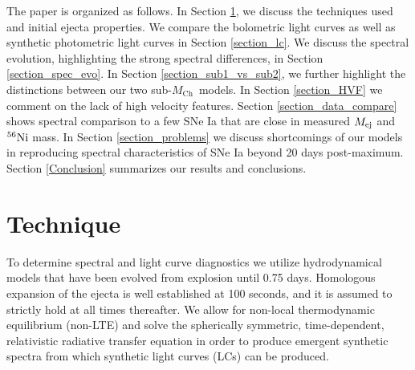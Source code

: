 \documentclass[useAMS,usenatbib,useasmath]{mnras}
\newcommand{\Mch}{\hbox{$M_{\text{Ch}}$}}
\newcommand{\elem}[2][default]{$^{#1}{\rm #2}$}
\begin{document}
The paper is organized as follows. In Section \ref{section_technique}, we discuss the techniques used and initial ejecta properties. We compare the bolometric light curves as well as synthetic photometric light curves in Section \ref{section_lc}. We discuss the spectral evolution, highlighting the strong spectral differences, in Section \ref{section_spec_evo}. In Section \ref{section_sub1_vs_sub2}, we further highlight the distinctions between our two sub-\Mch\ models. In Section \ref{section_HVF} we comment on the lack of high velocity features. Section \ref{section_data_compare} shows spectral comparison to a few SNe Ia that are close in measured $M_{\rm ej}$ and \elem[56]{Ni} mass. In Section \ref{section_problems} we discuss shortcomings of our models in reproducing spectral characteristics of SNe Ia beyond 20 days post-maximum. Section \ref{Conclusion} summarizes our results and conclusions.

\section{Technique}%
\label{section_technique}
To determine spectral and light curve diagnostics we utilize hydrodynamical models that have been evolved from explosion until 0.75 days. Homologous expansion of the ejecta is well established at 100 seconds, and it is assumed to strictly hold at all times thereafter. We allow for non-local thermodynamic equilibrium (non-LTE) and solve the spherically symmetric, time-dependent, relativistic radiative transfer equation in order to produce emergent synthetic spectra from which synthetic light curves (LCs) can be produced.
\end{document}
